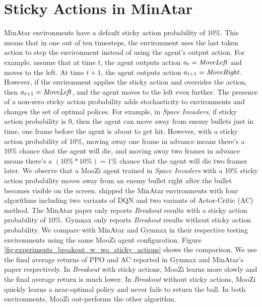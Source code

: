 \section{Sticky Actions in MinAtar} \label{sec:sticky_minatar}
MinAtar environments have a default sticky action probability of 10\%.
This means that in one out of ten timesteps, the environment uses the last taken action to step the environment instead of using the agent's output action.
For example, assume that at time $t$, the agent outputs action $a_t = \text{\textit{MoveLeft}}$ and moves to the left.
At time $t+1$, the agent outputs action $a_{t+1} = \text{\textit{MoveRight}}$.
However, if the environment applies the sticky action and overrides the action, then $a_{t+1} = \text{\textit{MoveLeft}}$, and the agent moves to the left even further.
The presence of a non-zero sticky action probability adds stochasticity to environments and changes the set of optimal polices.
For example, in \textit{Space Invaders}, if sticky action probability is 0, then the agent can move away from enemy bullets just in time, one frame before the agent is about to get hit.
However, with a sticky action probability of 10\%, moving away one frame in advance means there's a 10\% chance that the agent will die, and moving away two frames in advance means there's a $(10\% * 10\%) = 1\%$ chance that the agent will die two frames later.
We observe that a MooZi agent trained in \textit{Space Invaders} with a 10\% sticky action probability moves away from an enemy bullet right after the bullet becomes visible on the screen.
\citeauthor{MinAtarAtariInspiredTestbed_Young.Tian_2019} shipped the MinAtar environments with four algorithms including two variants of DQN and two variants of Actor-Critic (AC) method.
The MinAtar paper \cite{MinAtarAtariInspiredTestbed_Young.Tian_2019} only reports \textit{Breakout} results with a sticky action probability of 10\%.
Gymnax only reports \textit{Breakout} results without sticky action probability.
We compare with MinAtar and Gymnax in their respective testing environments using the same MooZi agent configuration.
Figure \ref{fig:experiments_breakout_w_wo_sticky_actions} shows the comparison.
We use the final average returns of PPO and AC reported in Gymnax and MinAtar's paper respectively.
In \textit{Breakout} with sticky actions, MooZi learns more slowly and the final average return is much lower.
In \textit{Breakout} without sticky actions, MooZi quickly learns a near-optimal policy and never fails to return the ball.
In both environments, MooZi out-performs the other algorithm.

